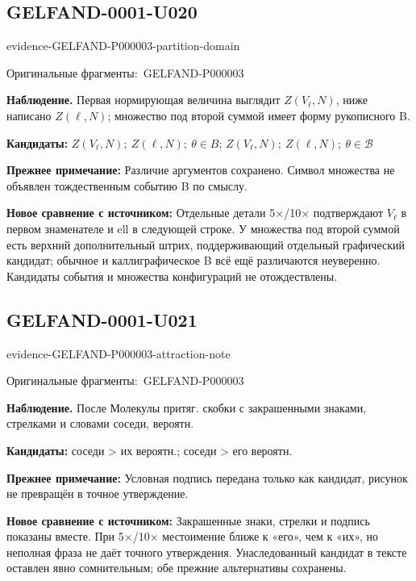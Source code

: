 \documentclass[11pt]{article}
\newcommand{\EvidenceBlock}[4]{%
 \par\smallskip\noindent\begin{minipage}{\linewidth}
 \begin{minipage}[t]{.47\linewidth}\vspace{0pt}\centering
 \csname evidence-#1-#2\endcsname\par
 {\scriptsize\SourceCropCaption\ #1}\par
 \end{minipage}\hfill
 \begin{minipage}[t]{.49\linewidth}\vspace{0pt}\raggedright
 {\small\color{orange!65!black}\textbf{#4} #3}\par
 \end{minipage}
 \end{minipage}\par\smallskip}
\newcommand{\SourceCropCaption}{Оригинальные фрагменты:}\newcommand{\ReadingCaption}{Сомнительное чтение.}\newcommand{\IncompleteCaption}{Неразобранный фрагмент.}\newcommand{\DiagramCaption}{Рисунок и набранное описание.}
\begin{document}
\subsection*{GELFAND-0001-U020}
\EvidenceBlock{GELFAND-P000003}{partition-domain}{Первая нормирующая величина выглядит \(Z(V_\ell,N)\), ниже написано \(Z(\ell,N)\); множество под второй суммой имеет форму рукописного B.}{Наблюдение.}
\par\smallskip\noindent\textbf{Кандидаты: } \(Z(V_\ell,N);\ Z(\ell,N);\ \theta\in B\); \(Z(V_\ell,N);\ Z(\ell,N);\ \theta\in\mathcal B\)\par
\par\smallskip\noindent\textbf{Прежнее примечание: } Различие аргументов сохранено. Символ множества не объявлен тождественным событию B по смыслу.\par
\par\smallskip\noindent\textbf{Новое сравнение с источником: } Отдельные детали 5×/10× подтверждают \(V_\ell\) в первом знаменателе и ell в следующей строке. У множества под второй суммой есть верхний дополнительный штрих, поддерживающий отдельный графический кандидат; обычное и каллиграфическое B всё ещё различаются неуверенно. Кандидаты события и множества конфигураций не отождествлены.\par

\subsection*{GELFAND-0001-U021}
\EvidenceBlock{GELFAND-P000003}{attraction-note}{После Молекулы притяг. скобки с закрашенными знаками, стрелками и словами соседи, вероятн.}{Наблюдение.}
\par\smallskip\noindent\textbf{Кандидаты: } соседи > их вероятн.; соседи > его вероятн.\par
\par\smallskip\noindent\textbf{Прежнее примечание: } Условная подпись передана только как кандидат, рисунок не превращён в точное утверждение.\par
\par\smallskip\noindent\textbf{Новое сравнение с источником: } Закрашенные знаки, стрелки и подпись показаны вместе. При 5×/10× местоимение ближе к «его», чем к «их», но неполная фраза не даёт точного утверждения. Унаследованный кандидат в тексте оставлен явно сомнительным; обе прежние альтернативы сохранены.\par
\end{document}
